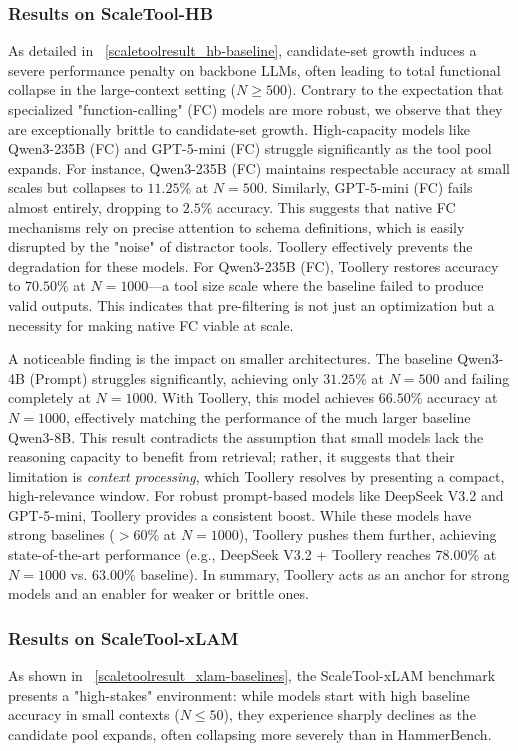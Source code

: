 \documentclass[11pt]{article}
\begin{document}
\subsubsection{Results on ScaleTool-HB}
As detailed in ~\ref{scaletoolresult_hb-baseline}, candidate-set growth induces a severe performance penalty on backbone LLMs, often leading to total functional collapse in the large-context setting ($N \ge 500$). Contrary to the expectation that specialized "function-calling" (FC) models are more robust, we observe that they are exceptionally brittle to candidate-set growth. High-capacity models like Qwen3-235B (FC) and GPT-5-mini (FC) struggle significantly as the tool pool expands. For instance, Qwen3-235B (FC) maintains respectable accuracy at small scales but collapses to $11.25\%$ at $N=500$. Similarly, GPT-5-mini (FC) fails almost entirely, dropping to $2.5\%$ accuracy. This suggests that native FC mechanisms rely on precise attention to schema definitions, which is easily disrupted by the "noise" of distractor tools. Toollery effectively prevents the degradation for these models. For Qwen3-235B (FC), Toollery restores accuracy to $70.50\%$ at $N=1000$---a tool size scale where the baseline failed to produce valid outputs. This indicates that pre-filtering is not just an optimization but a necessity for making native FC viable at scale.

A noticeable finding is the impact on smaller architectures. The baseline Qwen3-4B (Prompt) struggles significantly, achieving only $31.25\%$ at $N=500$ and failing completely at $N=1000$. With Toollery, this model achieves $66.50\%$ accuracy at $N=1000$, effectively matching the performance of the much larger baseline Qwen3-8B. This result contradicts the assumption that small models lack the reasoning capacity to benefit from retrieval; rather, it suggests that their limitation is \textit{context processing}, which Toollery resolves by presenting a compact, high-relevance window. For robust prompt-based models like DeepSeek V3.2 and GPT-5-mini, Toollery provides a consistent boost. While these models have strong baselines ($>60\%$ at $N=1000$), Toollery pushes them further, achieving state-of-the-art performance (e.g., DeepSeek V3.2 + Toollery reaches $78.00\%$ at $N=1000$ vs. $63.00\%$ baseline). In summary, Toollery acts as an anchor for strong models and an enabler for weaker or brittle ones.


\subsubsection{Results on ScaleTool-xLAM}
As shown in ~\ref{scaletoolresult_xlam-baselines}, the ScaleTool-xLAM benchmark presents a "high-stakes" environment: while models start with high baseline accuracy in small contexts ($N \le 50$), they experience sharply declines as the candidate pool expands, often collapsing more severely than in HammerBench.
\end{document}
